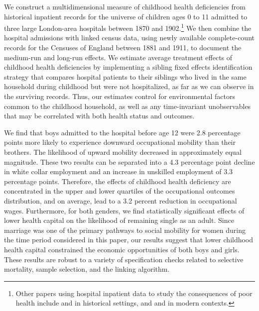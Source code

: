 \documentclass[12pt,english]{article}
\begin{document}
We construct a multidimensional measure of childhood health deficiencies from historical inpatient records for the universe of children ages 0 to 11 admitted to three large London-area hospitals between 1870 and 1902.\footnote{Other papers using hospital inpatient data to study the consequences of poor health include \cite{ArthiSchneider2021} and \cite{Doyle-etal2019} in historical settings, and \cite{Currie2010} and \cite{Schwandt2018} in modern contexts.} We then combine the hospital admissions with linked census data, using newly available complete-count records for the Censuses of England between 1881 and 1911, to document the medium-run and long-run effects. We estimate average treatment effects of childhood health deficiencies by implementing a sibling fixed effects identification strategy that compares hospital patients to their siblings who lived in the same household during childhood but were not hospitalized, as far as we can observe in the surviving records. Thus, our estimates control for environmental factors common to the childhood household, as well as any time-invariant unobservables that may be correlated with both health status and outcomes.

We find that boys admitted to the hospital before age 12 were 2.8 percentage points more likely to experience downward occupational mobility than their brothers. The likelihood of upward mobility decreased in approximately equal magnitude. These two results can be separated into a 4.3 percentage point decline in white collar employment and an increase in unskilled employment of 3.3 percentage points. Therefore, the effects of childhood health deficiency are concentrated in the upper and lower quartiles of the occupational outcomes distribution, and on average, lead to a 3.2 percent reduction in occupational wages. Furthermore, for both genders, we find statistically significant effects of lower health capital on the likelihood of remaining single as an adult. Since marriage was one of the primary pathways to social mobility for women during the time period considered in this paper, our results suggest that lower childhood health capital constrained the economic opportunities of both boys and girls. These results are robust to a variety of specification checks related to selective mortality, sample selection, and the linking algorithm. 
\end{document}
